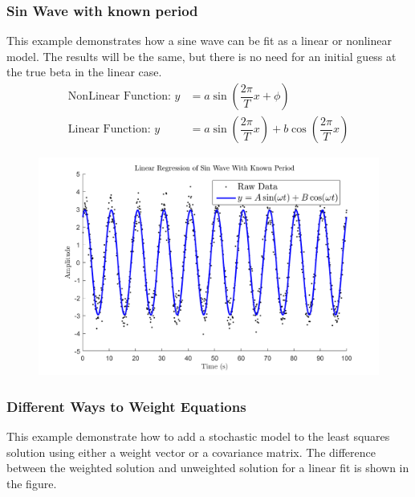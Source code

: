 \documentclass{article}
\begin{document}
	\subsubsection*{Sin Wave with known period}
	This example demonstrates how a sine wave can be fit as a linear or nonlinear model.  The results will be the same, but there is no need for an initial guess at the true beta in the linear case.
	\begin{align*}
	\text{NonLinear Function:  }y &= a\sin(\dfrac{2\pi}{T}x+\phi) \\
	\text{Linear Function:  }y &= a\sin(\dfrac{2\pi}{T}x) + b\cos(\dfrac{2\pi}{T}x)
	\end{align*}
	
	
	
	\begin{figure}[H]
		\centering
		\includegraphics[width = \linewidth]{sin}
	\end{figure}
	
	\clearpage
	\subsubsection*{Different Ways to Weight Equations}
	This example demonstrate how to add a stochastic model to the least squares solution using either a weight vector or a covariance matrix.  The difference between the weighted solution and unweighted solution for a linear fit is shown in the figure.
	
	
\end{document}
